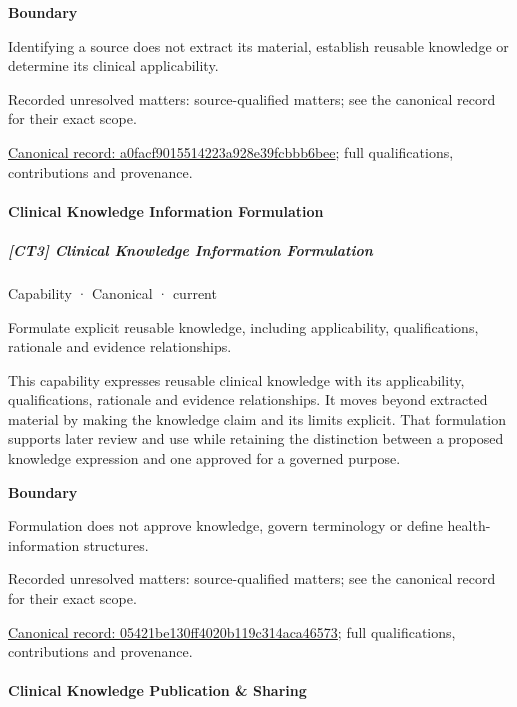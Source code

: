 \textbf{Boundary}



Identifying a source does not extract its material, establish reusable knowledge or determine its clinical applicability.


{\small Recorded unresolved matters: source-qualified matters; see the canonical record for their exact scope.}\par
{\footnotesize \href{../../../../continuum/strategy/capability/a0facf9015514223a928e39fcbbb6bee.md}{Canonical record: a0facf9015514223a928e39fcbbb6bee}; full qualifications, contributions and provenance.}\par
\paragraph{Clinical Knowledge Information Formulation}

\subparagraph{[CT3] Clinical Knowledge Information Formulation}

\label{element:05421be130ff4020b119c314aca46573}
{\small Capability · Canonical · current}\par

Formulate explicit reusable knowledge, including applicability, qualifications, rationale and evidence relationships.



This capability expresses reusable clinical knowledge with its applicability, qualifications, rationale and evidence relationships. It moves beyond extracted material by making the knowledge claim and its limits explicit. That formulation supports later review and use while retaining the distinction between a proposed knowledge expression and one approved for a governed purpose.



\textbf{Boundary}



Formulation does not approve knowledge, govern terminology or define health-information structures.


{\small Recorded unresolved matters: source-qualified matters; see the canonical record for their exact scope.}\par
{\footnotesize \href{../../../../continuum/strategy/capability/05421be130ff4020b119c314aca46573.md}{Canonical record: 05421be130ff4020b119c314aca46573}; full qualifications, contributions and provenance.}\par
\paragraph{Clinical Knowledge Publication \& Sharing}

